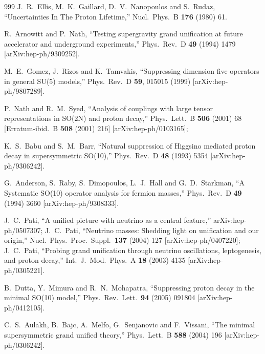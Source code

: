 \begin{thebibliography}{999}
  J.~R.~Ellis, M.~K.~Gaillard, D.~V.~Nanopoulos and S.~Rudaz,
  ``Uncertainties In The Proton Lifetime,''
  Nucl.\ Phys.\ B {\bf 176} (1980) 61.

  R.~Arnowitt and P.~Nath,
  ``Testing supergravity grand unification at future accelerator and
  underground experiments,''
  Phys.\ Rev.\ D {\bf 49} (1994) 1479
  [arXiv:hep-ph/9309252].

  M.~E.~Gomez, J.~Rizos and K.~Tamvakis,
  ``Suppressing dimension five operators in general SU(5) models,''
  Phys.\ Rev.\ D {\bf 59}, 015015 (1999)
  [arXiv:hep-ph/9807289].

  P.~Nath and R.~M.~Syed,
  ``Analysis of couplings with large tensor representations in SO(2N) and
  proton decay,''
  Phys.\ Lett.\ B {\bf 506} (2001) 68
  [Erratum-ibid.\ B {\bf 508} (2001) 216]
  [arXiv:hep-ph/0103165];

  K.~S.~Babu and S.~M.~Barr,
  ``Natural suppression of Higgsino mediated proton decay in supersymmetric
  SO(10),''
  Phys.\ Rev.\ D {\bf 48} (1993) 5354
  [arXiv:hep-ph/9306242].

  G.~Anderson, S.~Raby, S.~Dimopoulos, L.~J.~Hall and G.~D.~Starkman,
  ``A Systematic SO(10) operator analysis for fermion masses,''
  Phys.\ Rev.\ D {\bf 49} (1994) 3660
  [arXiv:hep-ph/9308333].

  J.~C.~Pati,
  ``A unified picture with neutrino as a central feature,''
  arXiv:hep-ph/0507307; 
J.~C.~Pati,
  ``Neutrino masses: Shedding light on unification and our origin,''
  Nucl.\ Phys.\ Proc.\ Suppl.\  {\bf 137} (2004) 127
  [arXiv:hep-ph/0407220]; 
J.~C.~Pati,
   ``Probing grand unification through neutrino oscillations, 
leptogenesis,  and proton decay,''
  Int.\ J.\ Mod.\ Phys.\ A {\bf 18} (2003) 4135
  [arXiv:hep-ph/0305221].

  B.~Dutta, Y.~Mimura and R.~N.~Mohapatra,
  ``Suppressing proton decay in the minimal SO(10) model,''
  Phys.\ Rev.\ Lett.\  {\bf 94} (2005) 091804
  [arXiv:hep-ph/0412105].

  C.~S.~Aulakh, B.~Bajc, A.~Melfo, G.~Senjanovic and F.~Vissani,
  ``The minimal supersymmetric grand unified theory,''
  Phys.\ Lett.\ B {\bf 588} (2004) 196
  [arXiv:hep-ph/0306242].


\end{thebibliography}
